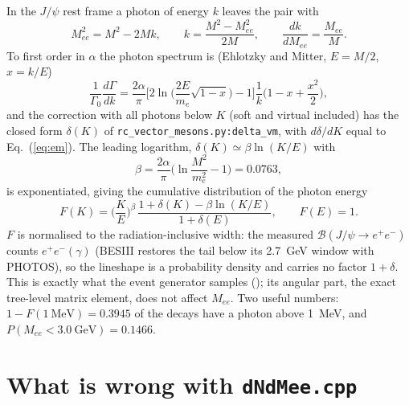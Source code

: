 \documentclass[11pt]{article}
\newcommand{\Mee}{M_{ee}}
\newcommand{\Jpsi}{J/\psi}
\begin{document}
In the $\Jpsi$ rest frame a photon of energy $k$ leaves the pair with
\begin{equation}
  \Mee^2 = M^2 - 2Mk ,\qquad k = \frac{M^2-\Mee^2}{2M},\qquad
  \frac{dk}{d\Mee} = \frac{\Mee}{M}.
  \label{eq:kin}
\end{equation}
To first order in $\alpha$ the photon spectrum is (Ehlotzky and Mitter, $E=M/2$, $x=k/E$)
\begin{equation}
  \frac{1}{\Gamma_0}\frac{d\Gamma}{dk} =
  \frac{2\alpha}{\pi}\Big[2\ln\Big(\frac{2E}{m_e}\sqrt{1-x}\Big)-1\Big]
  \frac{1}{k}\Big(1-x+\frac{x^2}{2}\Big),
  \label{eq:em}
\end{equation}
and the correction with all photons below $K$ (soft and virtual included) has the
closed form $\delta(K)$ of \texttt{rc\_vector\_mesons.py:delta\_vm}, with
$d\delta/dK$ equal to Eq.~(\ref{eq:em}).  The leading logarithm,
$\delta(K)\simeq\beta\ln(K/E)$ with
\begin{equation}
  \beta=\frac{2\alpha}{\pi}\Big(\ln\frac{M^2}{m_e^2}-1\Big)=0.0763,
\end{equation}
is exponentiated, giving the cumulative distribution of the photon energy
\begin{equation}
  F(K) = \Big(\frac{K}{E}\Big)^{\beta}\,
  \frac{1+\delta(K)-\beta\ln(K/E)}{1+\delta(E)},\qquad F(E)=1 .
  \label{eq:F}
\end{equation}
$F$ is normalised to the radiation-inclusive width: the measured
$\mathcal B(\Jpsi\to e^+e^-)$ counts $e^+e^-(\gamma)$ (BESIII restores the tail below
its 2.7~GeV window with PHOTOS), so the lineshape is a probability density and carries
no factor $1+\delta$.  This is exactly what the event generator samples
(); its angular part, the exact
tree-level matrix element, does not affect $\Mee$.  Two useful numbers:
$1-F(1~\text{MeV}) = 0.3945$ of the decays have a photon above 1~MeV, and
$P(\Mee<3.0~\text{GeV}) = 0.1466$.

\section{What is wrong with \texttt{dNdMee.cpp}}
\end{document}
